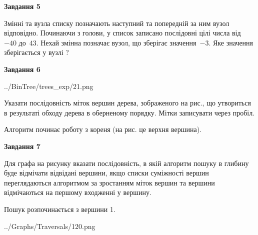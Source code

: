 \documentclass[12pt, ukrainian]{article}
\begin{document}
{\begin {large}
{\begin {center}\textbf{Завдання 5}\end {center}}\par
Змінні  та  вузла списку позначають наступний та попередній за ним вузол відповідно. Починаючи з голови, у список записано послідовні цілі числа від~$-40$ до~$43$. Нехай змінна  позначає вузол, що зберігає значення~$-3$.
Яке значення зберігається у вузлі  ?\par
\newpage

{\begin {center}\textbf{Завдання 6}\end {center}}\par

\begin{center}
	{../BinTree/trees_exp/21.png}
\end{center}
Указати послідовність міток вершин дерева, зображеного на рис., що утвориться в результаті обходу дерева в оберненому порядку. Мітки записувати через пробіл.\par Алгоритм починає роботу з кореня (на рис. це верхня вершина).\par
\newpage

{\begin {center}\textbf{Завдання 7}\end {center}}\par
Для графа на рисунку вказати послідовність, в якій алгоритм пошуку в глибину буде відмічати відвідані вершини, якщо списки суміжності вершин переглядаються алгоритмом за зростанням міток вершин та вершини відмічаються на першому вход\-женні у вершину.\par
Пошук розпочинається з вершини 1.\par

\begin{center}
	{../Graphs/Traversals/120.png}
\end{center}\par
\newpage


\end{large}}
\end{document}
